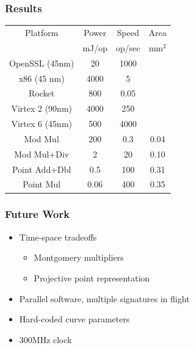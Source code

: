 \documentclass{beamer}
\begin{document}
\begin{frame}
  \frametitle{Results}

  \begin{center}
    \begin{tabular}{c|ccc}
      Platform        & Power & Speed  & Area \\
                      & mJ/op & op/sec & mm$^2$ \\
      \hline
      OpenSSL (45nm)  & 20    & 1000   &      \\
      x86 (45 nm)     & 4000  & 5      &      \\
      Rocket          & 800   & 0.05   &      \\
      Virtex 2 (90nm) & 4000  & 250    &      \\
      Virtex 6 (45nm) & 500   & 4000   &      \\
      \hline
      Mod Mul         & 200   & 0.3    & 0.04 \\
      Mod Mul+Div     & 2     & 20     & 0.10 \\
      Point Add+Dbl   & 0.5   & 100    & 0.31 \\
      Point Mul       & 0.06  & 400    & 0.35 \\
    \end{tabular}
  \end{center}
\end{frame}

\begin{frame}
  \frametitle{Future Work}

  \begin{itemize}
  \item Time-space tradeoffs
    \begin{itemize}
    \item Montgomery multipliers
    \item Projective point representation
    \end{itemize}
  \item Parallel software, multiple signatures in flight
  \item Hard-coded curve parameters
  \item 300MHz clock
  \end{itemize}
\end{frame}
\end{document}
